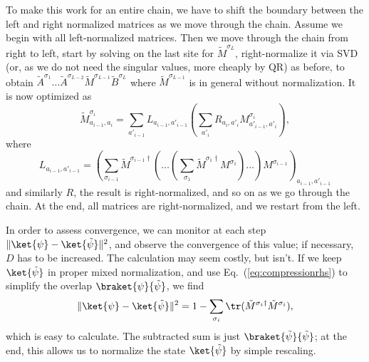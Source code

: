 To make this work for an entire chain, we have to shift the boundary between the left and right normalized matrices as we move through the chain. Assume we begin with all left-normalized matrices. Then we move through the chain from right to left, start by solving on the last site for $\tilde{M}^{\sigma_L}$, right-normalize it via SVD (or, as we do not need the singular values, more cheaply by QR) as before, to obtain $\tilde{A}^{\sigma_1} \ldots \tilde{A}^{\sigma_{L-2}} \tilde{M}^{\sigma_{L-1}} \tilde{B}^{\sigma_{L}}$ where $\tilde{M}^{\sigma_{L-1}}$ is in general without normalization. It is now optimized as
\begin{equation}
\tilde{M}^{\sigma_i}_{a_{i-1},a_i} =  \sum_{a'_{i-1}} L_{a_{i-1},a'_{i-1}} \left( \sum_{a'_i} R_{a_{i},a'_{i}}
M^{\sigma_i}_{a'_{i-1},a'_i} \right), 
\label{eq:compressionrhs}
\end{equation}
where 
\begin{equation}
L_{a_{i-1},a'_{i-1}} = \left( \sum_{\sigma_{i-1}}  \tilde{M}^{\sigma_{i-1}\dagger} \left( \ldots \left( \sum_{\sigma_1}  
\tilde{M}^{\sigma_{1}\dagger} M^{\sigma_{1}} \right) \ldots \right) M^{\sigma_{i-1}} \right)_{a_{i-1},a'_{i-1}}
\end{equation}
and similarly $R$, the result is right-normalized, and so on as we go through the chain. At the end, all matrices are right-normalized, and we restart from the left.

In order to assess convergence, we can monitor at each step $\| \ket{\psi} - \ket{\tilde{\psi}} \|^2$, and observe the convergence of this value; if necessary, $D$ has to be increased. The calculation may seem costly, but isn't. If we keep $\ket{\tilde{\psi}}$ in proper mixed normalization, and use Eq.~(\ref{eq:compressionrhs}) to simplify the overlap $\braket{\psi}{\tilde{\psi}}$, we find
\begin{equation}
\| \ket{\psi} - \ket{\tilde{\psi}} \|^2 = 1 - \sum_{\sigma_i} \tr (\tilde{M}^{\sigma_i\dagger}\tilde{M}^{\sigma_i}) , 
\end{equation}
which is easy to calculate. The subtracted sum is just $\braket{\tilde{\psi}}{\tilde{\psi}}$; at the end, this allows us to normalize the state $\ket{\tilde{\psi}}$ by simple rescaling. 

